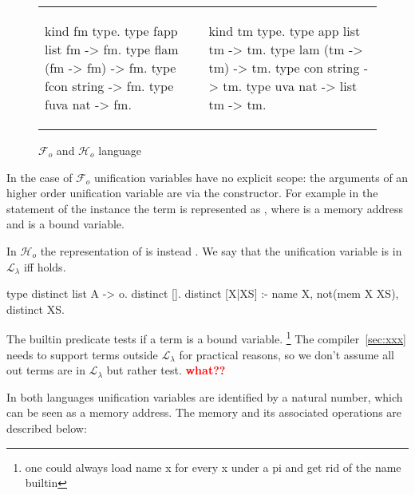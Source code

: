 \documentclass[sigconf,natbib=false,review]{acmart}
\newcommand{\llambda}{\ensuremath{\mathcal{L}_\lambda}\xspace}
\newcommand{\Fo}{\ensuremath{\mathcal{F}_{\!o}\xspace}} %
\newcommand{\Ho}{\ensuremath{\mathcal{H}_o}\xspace}
\begin{document}
\begin{figure}[H]
  \begin{tabular}{ll}
  \begin{minipage}{0.21\textwidth}
  \begin{elpicodetab}
kind fm type.
type fapp list fm -> fm.
type flam (fm -> fm) -> fm.
type fcon string -> fm.
type fuva nat -> fm.
\end{elpicodetab}
  \end{minipage}
  &
  \begin{minipage}{0.24\textwidth}
  \begin{elpicodetab}
kind tm type.
type app list tm -> tm.
type lam (tm -> tm) -> tm.
type con string -> tm.
type uva nat -> list tm -> tm.
  \end{elpicodetab}
  \end{minipage}
  \end{tabular}
  \caption{\Fo{} and \Ho language}\vspace{0.3em}
  \label{code:common-terms}
\end{figure}

\noindent
In the case of \Fo{} unification variables  have no explicit scope:
the arguments of an higher order unification variable are via the 
constructor. For example in the statement of the instance  the
term  is represented as , where  is
a memory address and  is a bound variable.

In \Ho the representation of  is instead .
We say that the unification variable  is in \llambda iff
 holds.

\begin{elpicode}
type distinct list A -> o.
distinct [].
distinct [X|XS] :- name X, not(mem X XS), distinct XS.
\end{elpicode}

\noindent
The  builtin predicate tests if a term is a bound variable.
\footnote{one could always load name x for every x under a pi and get rid of the name builtin}
The
compiler~\ref{sec:xxx} needs to support terms outside \llambda for practical
reasons, so we don't assume all out terms are in \llambda but rather test. \textbf{\textcolor{red}{what?? }}

In both languages unification variables are identified by a natural number,
which can be seen as a memory address. The memory and its associated
operations are described below:
\end{document}
